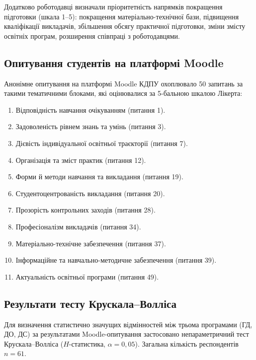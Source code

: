 Додатково роботодавці визначали пріоритетність напрямків покращення підготовки (шкала 1--5): покращення матеріально-технічної бази, підвищення кваліфікації викладачів, збільшення обсягу практичної підготовки, зміни змісту освітніх програм, розширення співпраці з роботодавцями.

\subsection{Опитування студентів на платформі Moodle}

Анонімне опитування на платформі Moodle КДПУ охоплювало 50 запитань за такими тематичними блоками, які оцінювалися за 5-бальною шкалою Лікерта:

\begin{enumerate}
    \item Відповідність навчання очікуванням (питання 1).
    \item Задоволеність рівнем знань та умінь (питання 3).
    \item Дієвість індивідуальної освітньої траєкторії (питання 7).
    \item Організація та зміст практик (питання 12).
    \item Форми й методи навчання та викладання (питання 19).
    \item Студентоцентрованість викладання (питання 20).
    \item Прозорість контрольних заходів (питання 28).
    \item Професіоналізм викладачів (питання 34).
    \item Матеріально-технічне забезпечення (питання 37).
    \item Інформаційне та навчально-методичне забезпечення (питання 39).
    \item Актуальність освітньої програми (питання 49).
\end{enumerate}

\subsection{Результати тесту Крускала--Волліса}

Для визначення статистично значущих відмінностей між трьома програмами (ГД, ДО, ДС) за результатами Moodle-опитування застосовано непараметричний тест Крускала--Волліса ($H$-статистика, $\alpha = 0{,}05$). Загальна кількість респондентів $n = 61$.

